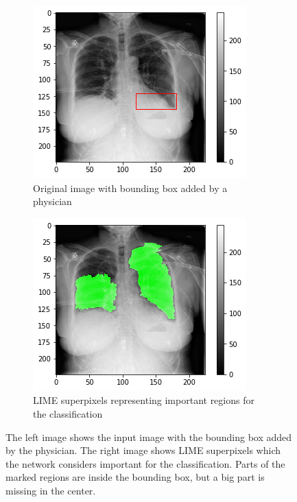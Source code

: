\begin{figure}[H]
    \centering
    \begin{subfigure}[t]{.45\textwidth}
        \centering
        \includegraphics[width=\linewidth]{chapters/03_classification/images/rise1_bbox.png}
        \caption{Original image with bounding box added by a physician}
    \end{subfigure}\hspace{1cm}%
    \begin{subfigure}[t]{.45\textwidth}
        \centering
        \includegraphics[width=\linewidth]{chapters/03_classification/images/lime_2.png}
        \caption{LIME superpixels representing important regions for the classification}
    \end{subfigure}
    \caption{The left image shows the input image with the bounding box added by the physician. The right image shows LIME superpixels which the network considers important for the classification. Parts of the marked regions are inside the bounding box, but a big part is missing in the center.}
    \label{lime_example_2}
\end{figure}

